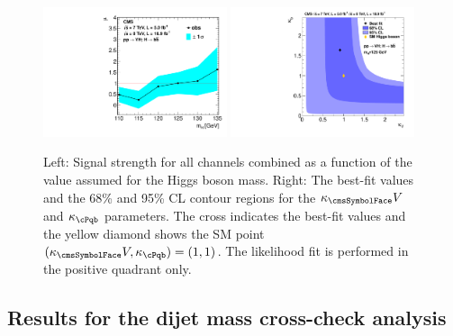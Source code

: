 \documentclass[11pt,twoside,a4paper,cmspaper,final,collab]{cms-tdr}
\begin{document}
\begin{figure}[htbp]
\centering
\includegraphics[width=0.48\textwidth]{PRD_muvalue_Jul20}
\includegraphics[width=0.48\textwidth]{PRD_cv_cf_vhbb}
\caption{Left: Signal strength for all channels combined as a
   function of the value assumed for the Higgs boson mass. Right: The
   best-fit values and the 68\% and 95\% CL contour
regions for the  $\kappa_\Vvar$ and $\kappa_\cPqb$
   parameters. The cross indicates the best-fit
values and the  yellow diamond shows the SM point  $(\kappa_\Vvar,
\kappa_\cPqb) = (1, 1)$. The likelihood fit is performed in the
 positive quadrant only.
}
    \label{fig:mu-values1}
\end{figure}


\subsection{Results for the dijet mass cross-check analysis}
\end{document}
